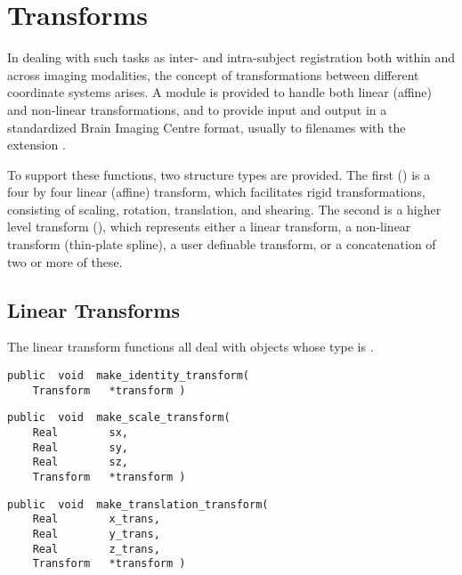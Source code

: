 \chapter{Transforms}

In dealing with such tasks as inter- and intra-subject registration
both within and across imaging modalities, the concept of
transformations between different coordinate systems arises.  A module
is provided to handle both linear (affine) and non-linear
transformations, and to provide input and output in a standardized
Brain Imaging Centre format, usually to filenames with the extension
.

To support these functions, two structure types are provided.  The
first () is a four by four linear (affine) transform,
which facilitates rigid transformations, consisting of scaling, rotation,
translation, and shearing.  The second is a higher level transform
(), which represents either a linear
transform, a non-linear transform (thin-plate spline), a user
definable transform, or a concatenation of two or more of these.

\section{Linear Transforms}

The linear transform functions all deal with objects whose type is
.

{\bf\begin{verbatim}
public  void  make_identity_transform(
    Transform   *transform )
\end{verbatim}}


{\bf\begin{verbatim}
public  void  make_scale_transform(
    Real        sx,
    Real        sy,
    Real        sz,
    Transform   *transform )
\end{verbatim}}


{\bf\begin{verbatim}
public  void  make_translation_transform(
    Real        x_trans,
    Real        y_trans,
    Real        z_trans,
    Transform   *transform )
\end{verbatim}}

